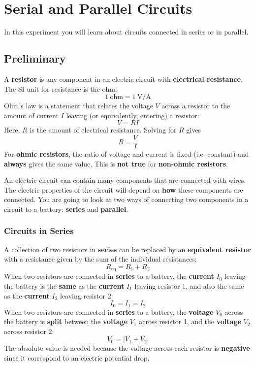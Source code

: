 \setcounter{chapter}{2}
\chapter{Serial and Parallel Circuits}
%
In this experiment you will learn about circuits connected in series or in parallel.
%
\section{Preliminary}
%
A \textbf{resistor} is any component in an electric circuit with \textbf{electrical resistance}. The SI unit for resistance is the ohm:
\begin{equation}
	1 \ \text{ohm} = 1 \ \text{V/A}
\end{equation}
Ohm's law is a statement that relates the voltage $V$ across a resistor to the amount of current $I$ leaving (or equivalently, entering) a resistor:
\begin{equation}
	V = R I
\end{equation}
Here, $R$ is the amount of electrical resistance. Solving for $R$ gives
\begin{equation} \label{eq.03.ROhmLaw}
	R = \frac{V}{I}
\end{equation}
For \textbf{ohmic resistors}, the ratio of voltage and current is fixed (i.e. constant) and \textbf{always} gives the same value. This is \textbf{not true} for \textbf{non-ohmic resistors}.

An electric circuit can contain many components that are connected with wires. The electric properties of the circuit will depend on \textbf{how} these components are connected. You are going to look at two ways of connecting two components in a circuit to a battery: \textbf{series} and \textbf{parallel}.
%
\subsection{Circuits in Series}
%
A collection of two resistors in \textbf{series} can be replaced by an \textbf{equivalent resistor} with a resistance given by the sum of the individual resistances:
\begin{equation} \label{eq.03.RSeries}
	R_{\text{eq}} = R_{1} + R_{2}
\end{equation}
When two resistors are connected in \textbf{series} to a battery, the \textbf{current} $I_{0}$ leaving the battery is the \textbf{same} as the \textbf{current} $I_{1}$ leaving resistor 1, and also the same as the \textbf{current} $I_{2}$ leaving resistor 2:
\begin{equation} \label{eq.03.ISeries}
	I_{0} = I_{1} = I_{2}
\end{equation}
When two resistors are connected in \textbf{series} to a battery, the \textbf{voltage} $V_{0}$ across the battery is \textbf{split} between the \textbf{voltage} $V_{1}$ across resistor 1, and the \textbf{voltage} $V_{2}$ across resistor 2:
\begin{equation} \label{eq.03.VSeries}
	V_{0} = \left| V_{1} + V_{2} \right|
\end{equation}
The absolute value is needed because the voltage across each resistor is \textbf{negative} since it correspond to an electric potential drop.
%
